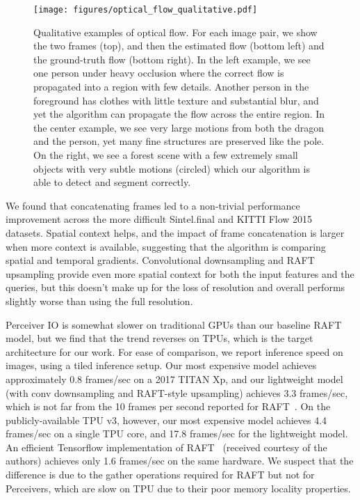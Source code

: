 \documentclass{article} \usepackage{iclr2022_conference,times}
\newcommand{\ourmodel}{Perceiver IO\xspace}
\begin{document}
\begin{figure*}[t]
    \centering
    \texttt{[image: figures/optical\_flow\_qualitative.pdf]}
    \caption{Qualitative examples of optical flow. For each image pair, we show the two frames (top), and then the estimated flow (bottom left) and the ground-truth flow (bottom right).  In the left example, we see one person under heavy occlusion where the correct flow is propagated into a region with few details. Another person in the foreground has clothes with little texture and substantial blur, and yet the algorithm can propagate the flow across the entire region.  In the center example, we see very large motions from both the dragon and the person, yet many fine structures are preserved like the pole.  On the right, we see a forest scene with a few extremely small objects with very subtle motions (circled) which our algorithm is able to detect and segment correctly.}
    \label{fig:flow_qualitative}
    \vspace{-8pt}
\end{figure*}

We found that concatenating frames led to a non-trivial performance improvement across the more difficult Sintel.final and KITTI Flow 2015~\citep{menze2015object} datasets. Spatial context helps, and the impact of frame concatenation is larger when more context is available, suggesting that the algorithm is comparing spatial and temporal gradients. Convolutional downsampling and RAFT upsampling provide even more spatial context for both the input features and the queries, but this doesn't make up for the loss of resolution and overall performs slightly worse than using the full resolution.

\ourmodel{} is somewhat slower on traditional GPUs than our baseline RAFT model, but we find that the trend reverses on TPUs, which is the target architecture for our work. For ease of comparison, we report inference speed on  images, using a tiled inference setup.  Our most expensive model achieves approximately 0.8 frames/sec on a 2017 TITAN Xp, and our lightweight model (with conv downsampling and RAFT-style upsampling) achieves 3.3 frames/sec, which is not far from the 10 frames per second reported for RAFT~\citep{teed2020raft}. On the publicly-available TPU v3, however, our most expensive model achieves 4.4 frames/sec on a single TPU core, and 17.8 frames/sec for the lightweight model. An efficient Tensorflow implementation of RAFT~\citep{sun2020tf} (received courtesy of the authors) achieves only 1.6 frames/sec on the same hardware.  We suspect that the difference is due to the gather operations required for RAFT but not for Perceivers, which are slow on TPU due to their poor memory locality properties.
\end{document}
